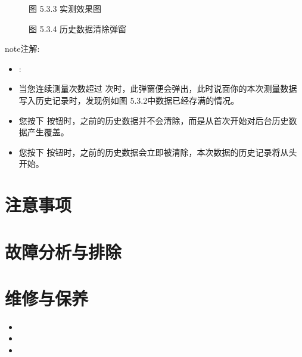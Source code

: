 \documentclass[a4paper,10pt,english]{sphinxmanual}
\begin{document}
\begin{figure}[htbp]
\centering
\capstart

\noindent{}
\caption{图 5.3.3 实测效果图}\label{\detokenize{operation_guide:id17}}\end{figure}

\begin{figure}[htbp]
\centering
\capstart

\noindent{}
\caption{图 5.3.4 历史数据清除弹窗}\label{\detokenize{operation_guide:id18}}\end{figure}

\begin{sphinxadmonition}{note}{注解:}\begin{itemize}
\item {} 
\sphinxAtStartPar
{} :

\item {} 
\sphinxAtStartPar
当您连续测量次数超过  次时，此弹窗便会弹出，此时说面你的本次测量数据写入历史记录时，发现例如图 5.3.2中数据已经存满的情况。

\item {} 
\sphinxAtStartPar
您按下  按钮时，之前的历史数据并不会清除，而是从首次开始对后台历史数据产生覆盖。

\item {} 
\sphinxAtStartPar
您按下  按钮时，之前的历史数据会立即被清除，本次数据的历史记录将从头开始。

\end{itemize}
\end{sphinxadmonition}


\section{注意事项}
\label{\detokenize{note:id1}}\label{\detokenize{note::doc}}

\section{故障分析与排除}
\label{\detokenize{fault:id1}}\label{\detokenize{fault::doc}}

\section{维修与保养}
\label{\detokenize{rapair:id1}}\label{\detokenize{rapair::doc}}\begin{itemize}
\item {} 
\sphinxAtStartPar
{}

\item {} 
\sphinxAtStartPar
{}

\item {} 
\sphinxAtStartPar
{}

\end{itemize}



\renewcommand{\indexname}{索引}
\printindex
\end{document}
